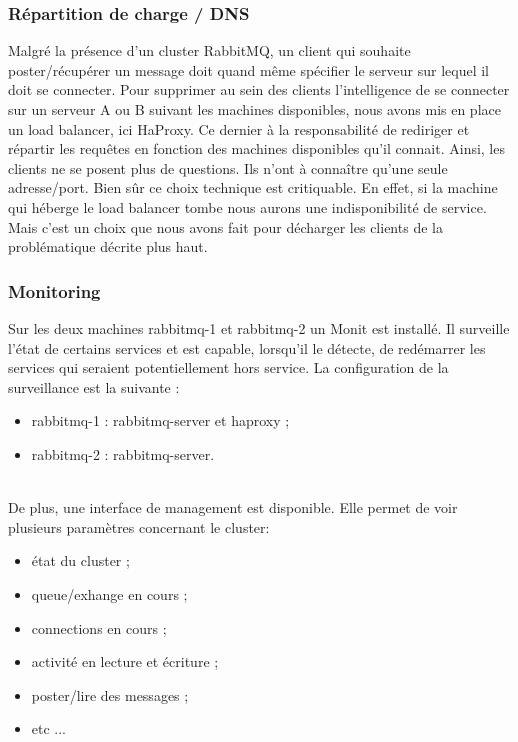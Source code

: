 \subsubsection{Répartition de charge / DNS}

Malgré la présence d'un cluster RabbitMQ, un client qui souhaite poster/récupérer un message doit quand même spécifier le serveur sur lequel il doit se connecter. Pour supprimer au sein des clients l'intelligence de se connecter sur un serveur A ou B suivant les machines disponibles, nous avons mis en place un load balancer, ici HaProxy. Ce dernier à la responsabilité de rediriger et répartir les requêtes en fonction des machines disponibles qu'il connait. Ainsi, les clients ne se posent plus de questions. Ils n'ont à connaître qu'une seule adresse/port. Bien sûr ce choix technique est critiquable. En effet, si la machine qui héberge le load balancer tombe nous aurons une indisponibilité de service. Mais c'est un choix que nous avons fait pour décharger les clients de la problématique décrite plus haut.

\subsubsection{Monitoring}

Sur les deux machines rabbitmq-1 et rabbitmq-2 un Monit est installé. Il surveille l'état de certains services et est capable, lorsqu'il le détecte, de redémarrer les services qui seraient potentiellement hors service. La configuration de la surveillance est la suivante :
\begin{itemize}
	\item rabbitmq-1 : rabbitmq-server et haproxy ;
	\item rabbitmq-2 : rabbitmq-server.
\end{itemize}
\ \\
De plus, une interface de management est disponible. Elle permet de voir plusieurs paramètres concernant le cluster:
\begin{itemize}
	\item état du cluster ;
	\item queue/exhange en cours ;
	\item connections en cours ;
	\item activité en lecture et écriture ;
	\item poster/lire des messages ;
	\item etc ...
\end{itemize}

